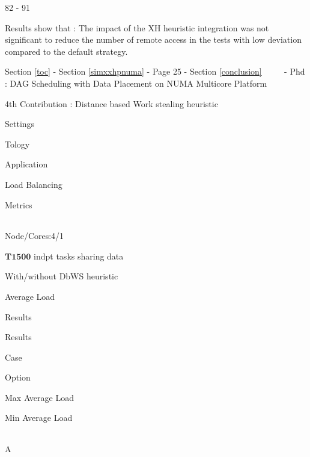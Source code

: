 \documentclass[11pt]{article}
\begin{document}
\textbar{}

82 - 91

Results show that : The impact of the XH heuristic integration was not
significant to reduce the number of remote access in the tests with low
deviation compared to the default strategy.

     {Section \ref{toc} - Section \ref{simxxhpnuma} - Page 25 -
Section \ref{conclusion} ~~~~ - Phd : DAG Scheduling with Data Placement
on NUMA Multicore Platform}

4th Contribution : Distance based Work stealing heuristic

Settings

\textbar{}

Tology

\textbar{}

Application

\textbar{}

Load Balancing

\textbar{}

Metrics

\begin{longtable}[]{@{}lllll@{}}
\toprule
\bottomrule
\end{longtable}

\textbar{}

Node/Cores:4/1

\textbar{}

\(\textbf{T1500}\) indpt tasks sharing data

\textbar{}

With/without DbWS heuristic

\textbar{}

Average Load

\textbar{}

Results

Results

\textbar{}

Case

\textbar{}

Option

\textbar{}

Max Average Load

\textbar{}

Min Average Load

\begin{longtable}[]{@{}llll@{}}
\toprule
\bottomrule
\end{longtable}

\textbar{}

A \textbar{}
\end{document}
